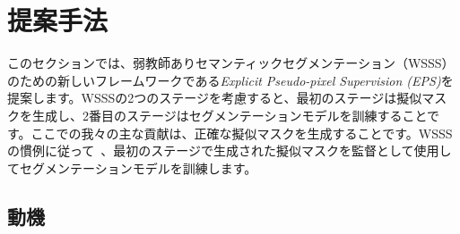 \documentclass[final]{cvpr}
\begin{document}
\section{提案手法}

このセクションでは、弱教師ありセマンティックセグメンテーション（WSSS）のための新しいフレームワークである\emph{Explicit Pseudo-pixel Supervision (EPS)}を提案します。WSSSの2つのステージを考慮すると、最初のステージは擬似マスクを生成し、2番目のステージはセグメンテーションモデルを訓練することです。ここでの我々の主な貢献は、正確な擬似マスクを生成することです。WSSSの慣例に従って~\cite{fan2020learning,jiang2019integral,lee2019ficklenet,li2018tell,wang2020self,wei2017object}、最初のステージで生成された擬似マスクを監督として使用してセグメンテーションモデルを訓練します。

\subsection{動機}
\label{section3.1}
\end{document}
